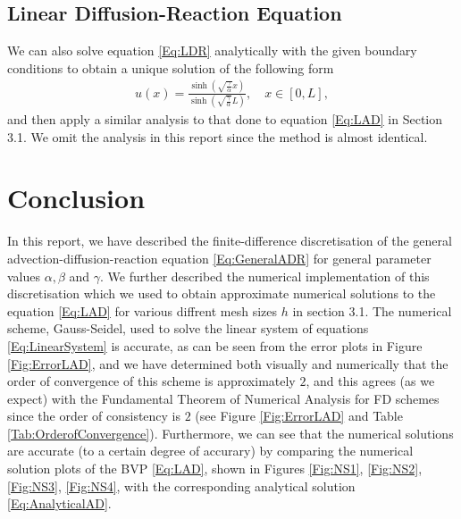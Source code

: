\documentclass[a4paper,11pt]{article}
\theoremstyle{break}
\theoremstyle{break2}
\theoremstyle{break}
\theoremstyle{break2}
\begin{document}
\subsection{Linear Diffusion-Reaction Equation}
We can also solve equation \eqref{Eq:LDR} analytically with the given boundary conditions to obtain a unique solution of the following form
\begin{align*}
u(x) = \frac{\sinh\left(\sqrt{\frac{\gamma}{\alpha}}x\right)}{\sinh\left(\sqrt{\frac{\gamma}{\alpha}}L\right)}, \quad x \in [0,L],
\end{align*}
and then apply a similar analysis to that done to equation \eqref{Eq:LAD} in Section 3.1. We omit the analysis in this report since the method is almost identical.

\section{Conclusion}
In this report, we have described the finite-difference discretisation of the general advection-diffusion-reaction equation \eqref{Eq:GeneralADR} for general parameter values $ \alpha,\beta $ and $ \gamma $. We further described the numerical implementation of this discretisation which we used to obtain approximate numerical solutions to the equation \eqref{Eq:LAD} for various diffrent mesh sizes $ h $ in section 3.1. The numerical scheme, Gauss-Seidel, used to solve the linear system of equations \eqref{Eq:LinearSystem} is accurate, as can be seen from the error plots in Figure \ref{Fig:ErrorLAD}, and we have determined both visually and numerically that the order of convergence of this scheme is approximately $ 2 $, and this agrees (as we expect) with the Fundamental Theorem of Numerical Analysis for FD schemes since the order of consistency is $ 2 $ (see Figure \ref{Fig:ErrorLAD} and Table \ref{Tab:OrderofConvergence}). Furthermore, we can see that the numerical solutions are accurate (to a certain degree of accurary) by comparing the numerical solution plots of the BVP \eqref{Eq:LAD}, shown in Figures \ref{Fig:NS1}, \ref{Fig:NS2}, \ref{Fig:NS3}, \ref{Fig:NS4}, with the corresponding analytical solution \eqref{Eq:AnalyticalAD}.
\end{document}
